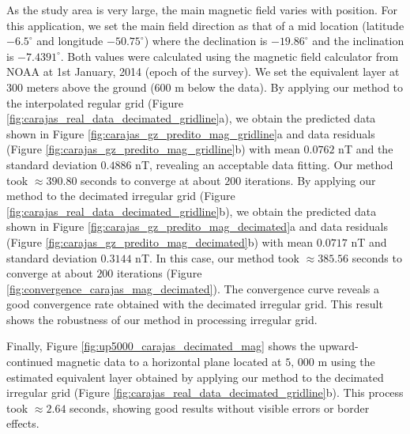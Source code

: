 As the study area is very large, the main magnetic field varies with position.
For this application, we set the main field direction as that of a mid location 
(latitude $-6.5^{\circ}$ and longitude $-50.75^{\circ}$) where the declination is $-19.86^{\circ}$ and
the inclination is $-7.4391^{\circ}$. Both values were calculated using the magnetic field calculator from NOAA
at 1st January, 2014 (epoch of the survey). 
%
%
%
%
We set the equivalent layer at $300$ meters above the ground ($600$ m below the data).
By applying our method to the interpolated regular grid 
(Figure \ref{fig:carajas_real_data_decimated_gridline}a), we obtain the  predicted data shown in 
Figure \ref{fig:carajas_gz_predito_mag_gridline}a and data residuals 
(Figure \ref{fig:carajas_gz_predito_mag_gridline}b) with mean $0.0762$ nT and the standard deviation 
$0.4886$ nT, revealing an acceptable data fitting.
Our method took $\approx 390.80$ seconds to converge at about $200$ iterations. %
%
%
By applying our method to the decimated irregular grid 
(Figure \ref{fig:carajas_real_data_decimated_gridline}b), we obtain the predicted data shown in 
Figure \ref{fig:carajas_gz_predito_mag_decimated}a and data residuals 
(Figure \ref{fig:carajas_gz_predito_mag_decimated}b) with mean $0.0717$ nT and standard deviation 
$0.3144$ nT. In this case, our method took $\approx 385.56$ seconds 
to converge at about $200$ iterations (Figure \ref{fig:convergence_carajas_mag_decimated}).
The convergence curve reveals a good convergence rate obtained with the decimated 
irregular grid. This result shows the robustness of our method in processing irregular grid.


Finally, Figure \ref{fig:up5000_carajas_decimated_mag} shows the upward-continued magnetic data to a
horizontal plane located at $5, \,000$ m using the estimated equivalent layer obtained by applying our
method to the decimated irregular grid (Figure \ref{fig:carajas_real_data_decimated_gridline}b).
This process took $\approx 2.64$ seconds, showing good results without visible errors or border 
effects.